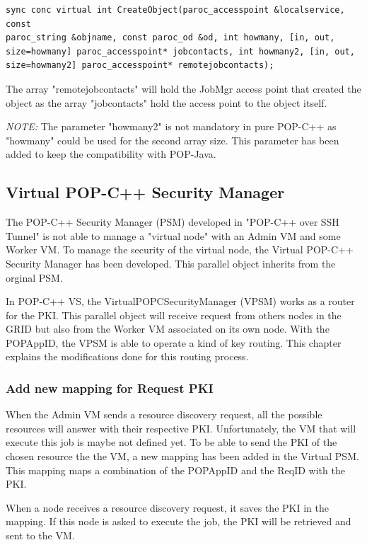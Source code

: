 \begin{lstlisting}
sync conc virtual int CreateObject(paroc_accesspoint &localservice, const 
paroc_string &objname, const paroc_od &od, int howmany, [in, out, 
size=howmany] paroc_accesspoint* jobcontacts, int howmany2, [in, out, 
size=howmany2] paroc_accesspoint* remotejobcontacts);
\end{lstlisting}\s

The array "remotejobcontacts" will hold the JobMgr access point that created the object as the array "jobcontacts" hold the access point to the object itself. \s

\textit{NOTE:} The parameter "howmany2" is not mandatory in pure POP-C++ as "howmany" could be used for the second array size. This parameter has been added to keep the compatibility with POP-Java. 


\subsection{Virtual POP-C++ Security Manager}
The POP-C++ Security Manager (PSM) developed in "POP-C++ over SSH Tunnel" is not able to manage a "virtual node" with an Admin VM and some Worker VM. To manage the security of the virtual node, the Virtual POP-C++ Security Manager has been developed. This parallel object inherits from the orginal PSM. \s

In POP-C++ VS, the VirtualPOPCSecurityManager (VPSM) works as a router for the PKI. This parallel object will receive request from others nodes in the GRID but also from the Worker VM associated on its own node. With the POPAppID, the VPSM is able to operate a kind of key routing. This chapter explains the modifications done for this routing process. 

\subsubsection{Add new mapping for Request PKI}
When the Admin VM sends a resource discovery request, all the possible resources will answer with their respective PKI. Unfortunately, the VM that will execute this job is maybe not defined yet. To be able to send the PKI of the chosen resource the the VM, a new mapping has been added in the Virtual PSM. This mapping maps a combination of the POPAppID and the ReqID with the PKI. \s

When a node receives a resource discovery request, it saves the PKI in the mapping. If this node is asked to execute the job, the PKI will be retrieved and sent to the VM.\s

